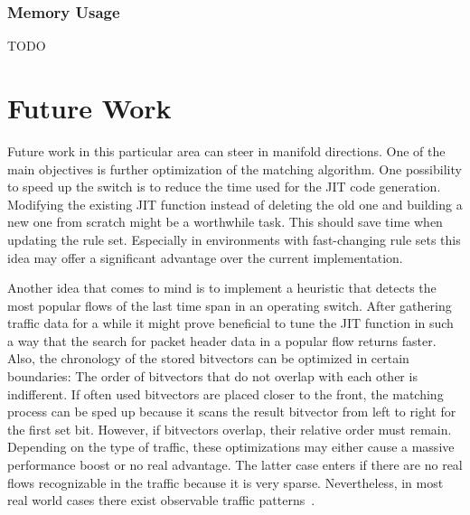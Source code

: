 \documentclass[a4paper,
		12pt,
		parskip=full,
		titlepage
		]{scrartcl}
\begin{document}
\subsubsection{Memory Usage}
TODO

\section{Future Work}
Future work in this particular area can steer in manifold directions.
One of the main objectives is further optimization of the matching algorithm.
One possibility to speed up the switch is to reduce the time used for the JIT code generation.
Modifying the existing JIT function instead of deleting the old one and building 
a new one from scratch might be a worthwhile task.
This should save time when updating the rule set.
Especially in environments with fast-changing rule sets this idea may offer 
a significant advantage over the current implementation.

Another idea that comes to mind is to implement a heuristic that detects 
the most popular flows of the last time span in an operating switch.
After gathering traffic data for a while it might prove beneficial to tune 
the JIT function in such a way that the search for packet header data in a popular flow returns faster.
Also, the chronology of the stored bitvectors can be optimized in certain boundaries:
The order of bitvectors that do not overlap with each other is indifferent.
If often used bitvectors are placed closer to the front, the matching process 
can be sped up because it scans the result bitvector from left to right for the first set bit.
However, if bitvectors overlap, their relative order must remain.
Depending on the type of traffic, these optimizations may either cause a massive performance boost or no real advantage.
The latter case enters if there are no real flows recognizable in the traffic because it is very sparse.
Nevertheless, in most real world cases there exist observable traffic patterns~\cite{elephantmice}.

\newpage
{}


\end{document}

